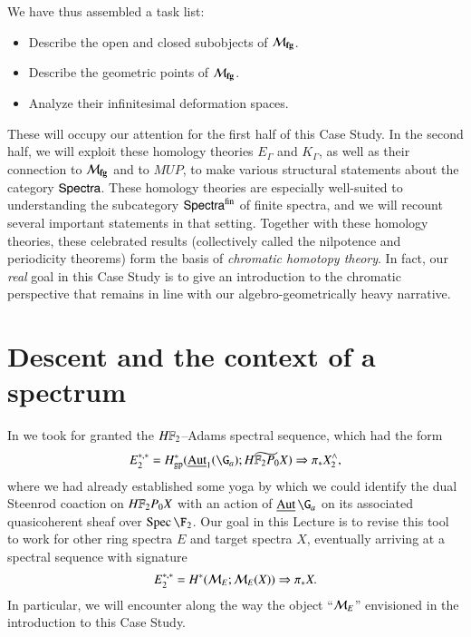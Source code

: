 We have thus assembled a task list:
\begin{itemize}
\item Describe the open and closed subobjects of $\mathcal{M}_{\mathbf{fg}}$.
\item Describe the geometric points of $\mathcal{M}_{\mathbf{fg}}$.
\item Analyze their infinitesimal deformation spaces.
\end{itemize}
These will occupy our attention for the first half of this Case Study.  In the second half, we will exploit these homology theories $E_\Gamma$ and $K_\Gamma$, as well as their connection to $\mathcal{M}_{\mathbf{fg}}$ and to $MUP$, to make various structural statements about the category $\mathsf{Spectra}$.  These homology theories are especially well-suited to understanding the subcategory $\mathsf{Spectra}^{\mathrm{fin}}$ of finite spectra, and we will recount several important statements in that setting.  Together with these homology theories, these celebrated results (collectively called the nilpotence and periodicity theorems) form the basis of \textit{chromatic homotopy theory}.  In fact, our \emph{real} goal in this Case Study is to give an introduction to the chromatic perspective that remains in line with our algebro-geometrically heavy narrative.








\section{Descent and the context of a spectrum}\label{StableContextLecture}

In  we took for granted the $\HFtwo$--Adams spectral sequence, which had the form \[E_2^{*, *} = H^*_{\mathrm{gp}}(\InternalAut_1(\G_a); \widetilde{\HFtwo P_0 X}) \Rightarrow \pi_* X^\wedge_2,\] where we had already established some yoga by which we could identify the dual Steenrod coaction on $\HFtwo P_0 X$ with an action of $\InternalAut{\G_a}$ on its associated quasicoherent sheaf over $\Spec \F_2$.  Our goal in this Lecture is to revise this tool to work for other ring spectra $E$ and target spectra $X$, eventually arriving at a spectral sequence with signature \[E_2^{*, *} = H^*(\mathcal{M}_{E}; \mathcal{M}_{E}(X)) \Rightarrow \pi_* X.\]  In particular, we will encounter along the way the object ``$\mathcal{M}_{E}$'' envisioned in the introduction to this Case Study.

